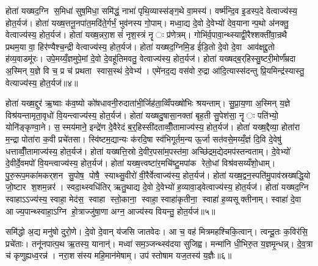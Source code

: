 होता॑ यख्षद॒ग्नि स॒मिधा॑ सुष॒मिधा॒ समि॑द्धं॒ नाभा॑ पृथि॒व्यास्स॑ङ्ग॒थे वा॒मस्य॑। वर्ष्म॑न्दि॒व इ॒डस्प॒दे वेत्वाज्य॑स्य॒ होत॒र्यज॑। होता॑ यख्ष॒त्तनू॒नपा॑त॒मदि॑ते॒र्गर्भं॒ भुव॑नस्य गो॒पाम्। मध्वा॒द्य दे॒वो दे॒वेभ्यो॑ देव॒यानान्प॒थो अ॑नक्तु॒ वेत्वाज्य॑स्य॒ होत॒र्यज॑। होता॑ यख्ष॒न्नरा॒शसं॑ नृश॒स्त्रं नॄः प्र॑णेत्रम्। गोभि॑र्व॒पावा॒न्थ्स्याद्वी॒रैश्शक्ती॑वा॒न्रथै प्रथम॒या वा॒ हिर॑ण्यैश्च॒न्द्री वेत्वाज्य॑स्य॒ होत॒र्यज॑। होता॑ यख्षद॒ग्निमि॒ड ई॑डि॒तो दे॒वो दे॒वा आव॑क्षद्दू॒तो ह॑व्य॒वाडमू॑रः। उपे॒मय्यँ॒ज्ञमुपे॒मां दे॒वो दे॒वहू॑तिमवतु॒ वेत्वाज्य॑स्य॒ होत॒र्यज॑। होता॑ यख्षद्ब॒र्‌हिस्सु॒ष्टरी॒मोर्णं॑म्रदा अ॒स्मिन् य॒ज्ञे वि च॒ प्र च॑ प्रथता स्वास॒स्थं दे॒वेभ्य॑। एमे॑नद॒द्य वस॑वो रु॒द्रा आ॑दि॒त्यास्स॑दन्तु प्रि॒यमिन्द्र॑स्यास्तु॒ वेत्याज्य॑स्य॒ होत॒र्यज॑॥४॥

होता॑ यख्ष॒द्दुर॑ ऋ॒ष्वाः क॑व॒ष्यो को॑षधावनी॒रुदाता॑भी॒र्जिह॑ता॒व्विँपख्षो॑भिः श्रयन्ताम्। सु॒प्रा॒य॒णा अ॒स्मिन् य॒ज्ञे विश्र॑यन्तामृता॒वृधो॑ वि॒यन्त्वाज्य॑स्य॒ होत॒र्यज॑। होता॑ यख्षदु॒षासा॒नक्ता॑ बृह॒ती सु॒पेश॑सा॒ नॄः पति॑भ्यो॒ योनि॑ङ्कृण्वा॒ने। स॒स्मय॑माने॒ इन्द्रे॑ण दे॒वैरेदं ब॒र्॒हिस्सी॑दताव्वीँ॒तामाज्य॑स्य॒ होत॒र्यज॑। होता॑ यख्ष॒द्दैव्या॒ होता॑रा म॒न्द्रा पोता॑रा क॒वी प्रचे॑तसा। स्वि॑ष्टम॒द्यान्यः क॑रदि॒षा स्व॑भिगूर्तम॒न्य ऊ॒र्जा सत॑वसे॒मय्यँ॒ज्ञं दि॒वि दे॒वेषु॑ धत्ताव्वीँ॒तामाज्य॑स्य॒ होत॒र्यज॑। होता॑ यख्षत्ति॒स्रो दे॒वीर॒पसा॑म॒पस्त॑मा॒ अच्छि॑द्रम॒द्येदमप॑स्तन्वताम्। दे॒वेभ्यो॑ दे॒वीर्दे॒वमपो॑ वि॒यन्त्वाज्य॑स्य॒ होत॒र्यज॑। होता॑ यख्ष॒त्त्वष्टा॑र॒मचि॑ष्टु॒मपा॑क रेतो॒धां विश्र॑वसय्यँशो॒धाम्। पु॒रु॒रूप॒मका॑मकर्‌शन सु॒पोष॒ पोषै॒ स्याथ्सु॒वीरो॑ वी॒रैर्वेत्वाज्य॑स्य॒ होत॒र्यज॑। होता॑ यख्ष॒द्वन॒स्पति॑मु॒पाव॑स्रख्षद्धि॒यो जो॒ष्टार श॒शम॒न्नर॑। स्वदा॒थ्स्वधि॑तिर् ऋतु॒थाद्य दे॒वो दे॒वेभ्यो॑ ह॒व्यावा॒ड्वेत्वाज्य॑स्य॒ होत॒र्यज॑। होता॑ यख्षद॒ग्नि स्वाहाऽऽज्य॑स्य॒ स्वाहा॒ मेद॑स॒ स्वाहा स्तो॒काना॒ स्वाहा॒ स्वाहा॑कृतीना॒ स्वाहा॑ ह॒व्यसूक्तीनाम्। स्वाहा॑ दे॒वा आज्य॒पान्थ्स्वाहा॒ऽग्नि हो॒त्राज्जु॑षा॒णा अग्न॒ आज्य॑स्य वियन्तु॒ होत॒र्यज॑॥५॥\anuvakamend[प्रि॒यमिन्द्र॑स्यास्तु॒ वेत्वाज्य॑स्य॒ होत॒र्यज॑ सु॒वीरो॑ वी॒रैर्वेत्वाज्य॑स्य॒ होत॒र्यज॑ च॒त्वारि॑ च (अ॒ग्निन्तनू॒नपा॑त॒न्नरा॒शस॑म॒ग्निमि॒ड ई॑डि॒तो ब॒र्‌हिर्दुर॑ उ॒षासा॒नक्ता॒ दैव्या॑ ति॒स्रस्त्वष्टा॑रं॒ वन॒स्पति॑म॒ग्निम्। पञ्च॒ वेत्वेको॑ वि॒यन्तु॒ द्विर्वी॒तामेको॑ वि॒यन्तु॒ द्विर्वेत्वेको॑ वियन्तु॒ होत॒र्यज॑ ॥ )]

समि॑द्धो अ॒द्य मनु॑षो दुरो॒णे। दे॒वो दे॒वान् य॑जसि जातवेदः। आ च॒ वह॑ मित्रमहश्चिकि॒त्वान्। त्वन्दू॒तः क॒विर॑सि॒ प्रचे॑ताः। तनू॑नपात्प॒थ ऋ॒तस्य॒ यानान्॑। मध्वा॑ सम॒ञ्जन्थ्स्व॑दया सुजिह्व। मन्मा॑नि धी॒भिरु॒त य॒ज्ञमृ॒न्धन्न्। दे॒व॒त्रा च॑ कृणुह्यध्व॒रन्न॑। नरा॒शस॑स्य महि॒मान॑मेषाम्। उप॑ स्तोषाम यज॒तस्य॑ य॒ज्ञैः॥६॥

